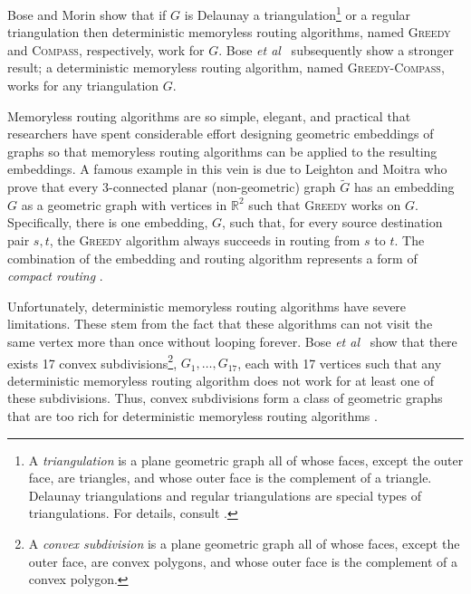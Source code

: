 \documentclass{elsarticle}
\newcommand{\R}{\mathbb{R}}
\newcommand{\etal}{\emph{et al}}
\begin{document}
Bose and Morin \cite{bose04} show that if $G$ is Delaunay a triangulation\footnote{A \emph{triangulation} is a plane geometric graph all of whose faces, except the outer face, are triangles, and whose outer face is the complement of a triangle. Delaunay triangulations and regular triangulations are special types of triangulations. For details, consult \cite{obs92}.} or a regular triangulation then deterministic memoryless routing algorithms, named \textsc{Greedy} and \textsc{Compass}, respectively, work for $G$. Bose \etal\ \cite{bose02} subsequently show a stronger result; a deterministic memoryless routing algorithm, named \textsc{Greedy-Compass}, works for any triangulation $G$.

Memoryless routing algorithms are so simple, elegant, and practical that researchers have spent considerable effort designing geometric embeddings of graphs so that memoryless routing algorithms can be applied to the resulting embeddings.  A famous example in this vein is due to Leighton and Moitra \cite{lm08} who prove that every 3-connected planar (non-geometric) graph $\tilde G$ has an embedding $G$ as a geometric graph with vertices in $\R^2$ such that \textsc{Greedy} works on $G$.  Specifically, there is one embedding, $G$, such that, for every source destination pair $s,t$, the \textsc{Greedy} algorithm always succeeds in routing from $s$ to $t$.  The combination of the embedding and routing algorithm represents a form of \emph{compact routing} \cite{l94}.

Unfortunately, deterministic memoryless routing algorithms have severe limitations.  These stem from the fact that these algorithms can not visit the same vertex more than once without looping forever.  Bose \etal\ \cite[Theorem~2]{bose04} show that there exists 17 convex subdivisions\footnote{A \emph{convex subdivision} is a plane geometric graph all of whose faces, except the outer face, are convex polygons, and whose outer face is the complement of a convex polygon.}, $G_1,\ldots,G_{17}$, each with 17 vertices such that any deterministic memoryless routing algorithm does not work for at least one of these subdivisions.  Thus, convex subdivisions form a class of geometric graphs that are too rich for deterministic memoryless routing algorithms \cite{bose02}.
\end{document}
